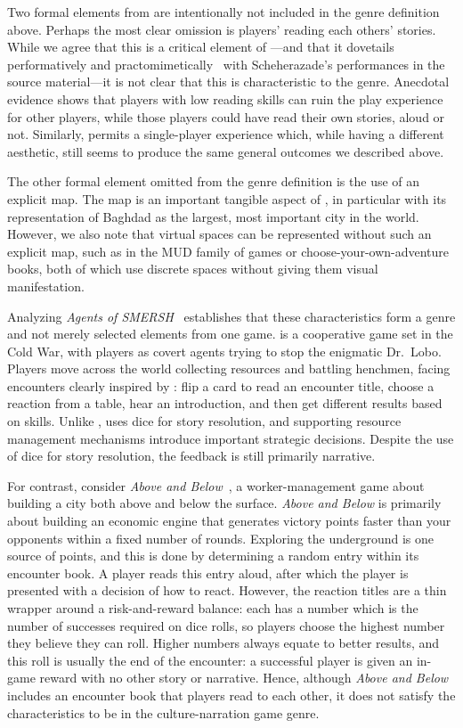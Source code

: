 \documentclass[a4paper]{article}
\begin{document}
Two formal elements from \totan{} are intentionally not included in the
genre definition above. Perhaps the most clear omission is players' reading
each others' stories. While we agree that this is a critical element of 
\totan{}---and that it dovetails performatively 
and practomimetically~\citep{Travis2011} with Scheherazade's
performances in the source material---it is not clear that this is
characteristic to the genre.  Anecdotal evidence shows that
players with low reading skills can ruin the play experience for other
players, while those players could have read their own stories, aloud or not.
Similarly, \totan{} permits a single-player experience which, while
having a different aesthetic, still seems to produce the same general outcomes
we described above.

The other formal element omitted from the genre definition is the use of an
explicit map. The map is an important tangible aspect of \totan{}, 
in particular with its representation of Baghdad as the largest, most
important city in the world. However, we also note that virtual spaces
can be represented without such an explicit map, such as in the MUD family
of games or choose-your-own-adventure books, both of which
use discrete spaces without giving them visual manifestation.

Analyzing \textit{Agents of SMERSH}~\citep{Maxwell2012} establishes that
these characteristics form a genre and not merely selected elements from one
game.
\smersh{} is a cooperative game set in the Cold War, with players as 
covert agents trying to stop the enigmatic Dr.\ Lobo. 
Players move across the world collecting resources and battling henchmen,
facing encounters clearly inspired by \totan{}: flip a card to read an
encounter title, choose a reaction from a table, hear an introduction,
and then get different results based on skills. Unlike \totan{},
\smersh{} uses dice for story resolution, and supporting resource
management mechanisms introduce important strategic decisions.
Despite the use of dice for story resolution, the feedback is still
primarily narrative.

For contrast, consider \textit{Above and Below}~\citep{Laukat2015}, a
worker-management game about building a city both above and below the
surface.  \textit{Above and Below} is primarily about building an
economic engine that generates victory points faster than your
opponents within a fixed number of rounds. Exploring the underground
is one source of points, and this is done by determining a random
entry within its encounter book.  A player reads this entry aloud,
after which the player is presented with a decision of how to
react. However, the reaction titles are a thin wrapper around a
risk-and-reward balance: each has a number which is the number of
successes required on dice rolls, so players choose the highest number
they believe they can roll. Higher numbers always equate to better results,
and this roll is usually the end of the encounter: a successful player
is given an in-game reward with no other story or narrative.
Hence, although \textit{Above and Below} includes an encounter book
that players read to each other, it does not satisfy the characteristics
to be in the culture-narration game genre.
\end{document}
